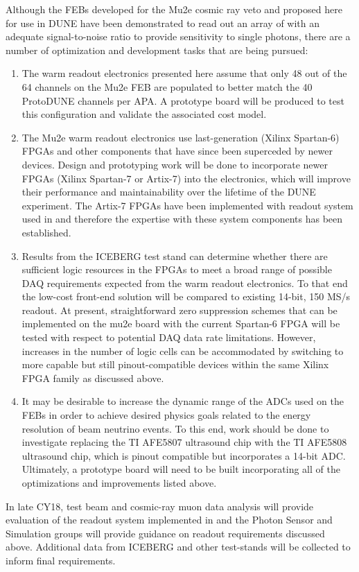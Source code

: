 Although the FEBs developed for the Mu2e cosmic ray veto and proposed here for use in DUNE have been demonstrated to read out an array of  with an adequate signal-to-noise ratio to provide sensitivity to single photons, there are a number of optimization and development tasks that are being pursued:  
\begin{enumerate}
\item The warm readout electronics presented here assume that only 48 out of the 64 channels on the Mu2e FEB are populated to better match the 40 ProtoDUNE channels per APA.  A prototype board will be produced to test this configuration and validate the associated cost model.  
\item The Mu2e warm readout electronics use last-generation (Xilinx Spartan-6) FPGAs and other components that have since been superceded by newer devices.  Design and prototyping work will be done to incorporate newer FPGAs (Xilinx Spartan-7 or Artix-7) into the electronics, which will improve their performance and maintainability over the lifetime of the DUNE experiment. The Artix-7 FPGAs have been implemented with  readout system used in  and therefore the expertise with these system components has been established. 
\item Results from the ICEBERG test stand can determine whether there are sufficient logic resources in the FPGAs to meet a broad range of possible DAQ requirements expected from the warm readout electronics. To that end the low-cost front-end solution will be compared to existing 14-bit, 150 MS/s  readout. At present, straightforward zero suppression schemes that can be implemented on the mu2e board with the current Spartan-6 FPGA will be tested with respect to potential DAQ data rate limitations.  However, increases in the number of logic cells can be accommodated by switching to more capable but still pinout-compatible devices within the same Xilinx FPGA family as discussed above.  
\item It may be desirable to increase the dynamic range of the ADCs used on the FEBs in order to achieve desired physics goals related to the energy resolution of beam neutrino events.  To this end, work should be done to investigate replacing the TI AFE5807 ultrasound chip with the TI AFE5808 ultrasound chip, which is pinout compatible but incorporates a 14-bit ADC.  Ultimately, a prototype board will need to be built incorporating all of the optimizations and improvements listed above.
\end{enumerate}
In late CY18,  test beam and cosmic-ray muon data analysis will provide evaluation of the readout system implemented in  and the  Photon Sensor and Simulation groups will provide guidance on readout requirements discussed above. Additional data from ICEBERG and other test-stands will be collected to inform final requirements.

